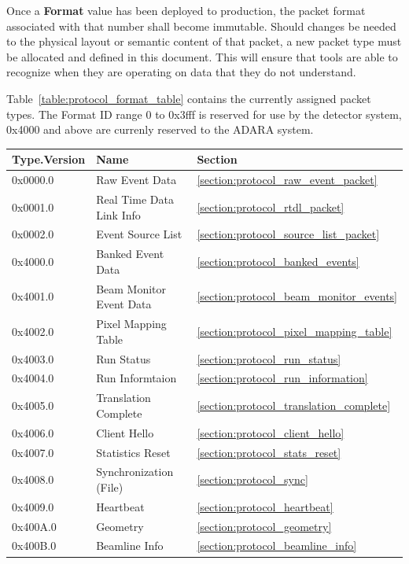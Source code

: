 Once a {\bf Format} value has been deployed to production,
the packet format associated with that number shall become immutable. Should
changes be needed to the physical layout or semantic content of that packet, a
new packet type must be allocated and defined in this document. This will
ensure that tools are able to recognize when they are operating on data that
they do not understand.

Table~\ref{table:protocol_format_table} contains the currently assigned
packet types. The Format ID range 0 to 0x3fff is reserved for use by
the detector system, 0x4000 and above are currenly reserved to the ADARA
system.

\begin{table}
  \begin{center}
    \begin{tabular}{l | l | l}
	Type.Version & Name & Section \\
	\hline
	0x0000.0 & Raw Event Data &
		\ref{section:protocol_raw_event_packet} \\
	0x0001.0 & Real Time Data Link Info &
		\ref{section:protocol_rtdl_packet} \\
	0x0002.0 & Event Source List &
		\ref{section:protocol_source_list_packet} \\
	0x4000.0 & Banked Event Data &
		\ref{section:protocol_banked_events} \\
	0x4001.0 & Beam Monitor Event Data &
		\ref{section:protocol_beam_monitor_events} \\
	0x4002.0 & Pixel Mapping Table &
		\ref{section:protocol_pixel_mapping_table} \\
	0x4003.0 & Run Status &
		\ref{section:protocol_run_status} \\
	0x4004.0 & Run Informtaion &
		\ref{section:protocol_run_information} \\
	0x4005.0 & Translation Complete &
		\ref{section:protocol_translation_complete} \\
	0x4006.0 & Client Hello &
		\ref{section:protocol_client_hello} \\
	0x4007.0 & Statistics Reset &
		\ref{section:protocol_stats_reset} \\
	0x4008.0 & Synchronization (File) &
		\ref{section:protocol_sync} \\
	0x4009.0 & Heartbeat &
		\ref{section:protocol_heartbeat} \\
	0x400A.0 & Geometry &
		\ref{section:protocol_geometry} \\
	0x400B.0 & Beamline Info &
		\ref{section:protocol_beamline_info} \\

\end{tabular}
\end{center}
\end{table}

